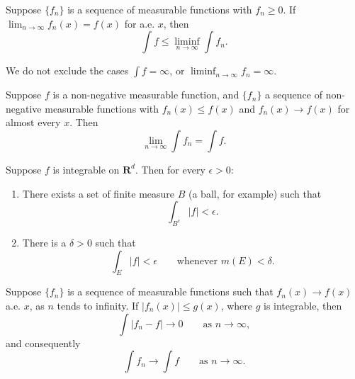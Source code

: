\begin{lemma}[Fatou]
	Suppose $\{f_n\}$ is a sequence of measurable functions with $f_n \geq 0$.
	If $\lim_{n \to \infty} f_n(x) = f(x)$ for a.e. $x$, then
	\begin{equation}
	\int f \leq \liminf_{n \to \infty} \int f_n.
	\end{equation}
\end{lemma}

\begin{remark}
	We do not exclude the cases $\int f = \infty$,
	or $\liminf_{n \to \infty} f_n = \infty$.
\end{remark}

\begin{corollary}
	Suppose $f$ is a non-negative measurable function, and $\{f_n\}$ a sequence
	of non-negative measurable functions with
	$f_n(x) \leq f(x)$ and $f_n(x) \to f(x)$ for almost every $x$. Then
	\begin{equation}
	\lim_{n \to \infty} \int f_n = \int f.
	\end{equation}
\end{corollary}

\begin{proposition}
	Suppose $f$ is integrable on $\mathbf{R}^d$. Then for every $\epsilon > 0$:
	\begin{enumerate}
		\renewcommand{\theenumi}{\roman{enumi}}
		\item There exists a set of finite measure $B$ (a ball, for example) such that
		\begin{equation}
		\int_{B^c} |f| < \epsilon.
		\end{equation}
		\item There is a $\delta > 0$ such that
		\begin{equation}
		\int_E |f| < \epsilon \qquad \text{whenever } m(E) < \delta.
		\end{equation}
	\end{enumerate}
\end{proposition}

\begin{theorem}
	Suppose $\{f_n\}$ is a sequence of measurable functions such that
	$f_n(x) \to f(x)$ a.e. $x$, as $n$ tends to infinity.
	If $|f_n(x)| \leq g(x)$, where $g$ is integrable, then
	\begin{equation}
	\int |f_n - f| \to 0 \qquad \text{as } n \to \infty,
	\end{equation}
	and consequently
	\begin{equation}
	\int f_n \to \int f \qquad \text{as } n \to \infty.
	\end{equation}
\end{theorem}

